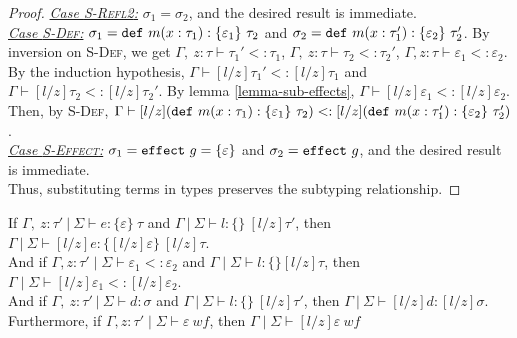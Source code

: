 \begin{proof}
\noindent\underline{\textit{Case \textsc{S-Refl2}:}} \mbox{$\sigma_1 = \sigma_2$}, and the desired result is immediate.\\

\sloppy
\noindent\underline{\textit{Case \textsc{S-Def}:}} \mbox{$\sigma_1 = \mathtt{def}~ m(x : \tau_1) : \{ \varepsilon_1 \}~\tau_2$} and \mbox{$\sigma_2 = \mathtt{def}~ m(x : \tau_1') : \{ \varepsilon_2 \}~\tau_2'$}. By inversion on \textsc{S-Def}, we get \mbox{$\Gamma,~z : \tau \vdash \tau_1' <: \tau_1$}, \mbox{$\Gamma,~z : \tau \vdash \tau_2 <: \tau_2'$}, \mbox{$\Gamma, z : \tau \vdash \varepsilon_1 <: \varepsilon_2$}. By the induction hypothesis, \mbox{$\Gamma \vdash [l/z]\tau_1' <: [l/z]\tau_1$} and \mbox{$\Gamma \vdash [l/z]\tau_2 <: [l/z]\tau_2'$}. By lemma \ref{lemma-sub-effects}, \mbox{$\Gamma \vdash [l/z]\varepsilon_1 <: [l/z]\varepsilon_2$}. Then, by \textsc{S-Def}, \mbox{$\Gamma \vdash [l/z](\mathtt{def}~ m(x : \tau_1) : \{ \varepsilon_1 \}~\tau_2) <: [l/z](\mathtt{def}~ m(x : \tau_1') : \{ \varepsilon_2 \}~\tau_2')$}.\\

\noindent\underline{\textit{Case \textsc{S-Effect}:}} \mbox{$\sigma_1 = \mathtt{effect}~ g = \{ \varepsilon \}$} and \mbox{$\sigma_2 = \mathtt{effect}~ g$}, and the desired result is immediate.\\

\noindent Thus, substituting terms in types preserves the subtyping relationship.
\end{proof}


\begin{lemma}
\label{lemma-sub-effects}
If \mbox{$\Gamma,~z : \tau'~|~\Sigma \vdash e :  \{ \varepsilon \}~\tau$} and \mbox{$\Gamma~|~\Sigma \vdash l : \{ \}~[l/z]\tau'$}, then \mbox{$\Gamma~|~\Sigma \vdash [l/z]e :  \{ [l/z]\varepsilon \}~[l/z]\tau$}. \\[3ex] And if $\Gamma, z : \tau' \mid \Sigma \vdash \varepsilon_1 <: \varepsilon_2$ and $\Gamma \mid \Sigma \vdash l : \{\} [l/z]\tau$, then $\Gamma \mid \Sigma \vdash [l/z] \varepsilon_1 <: [l/z] \varepsilon_2$.\\[3ex]
And if \mbox{$\Gamma,~z : \tau'~|~\Sigma \vdash d : \sigma$} and
\mbox{$\Gamma~|~\Sigma \vdash l : \{ \}~[l/z]\tau'$}, then $\Gamma~|~\Sigma \vdash [l/z]d : [l/z]\sigma$. \\[3ex]
Furthermore, if $\Gamma, z : \tau' \mid \Sigma \vdash \varepsilon\ {wf}$,  then 
$\Gamma \mid \Sigma \vdash [l/z]\varepsilon\ {wf}$
\end{lemma}


